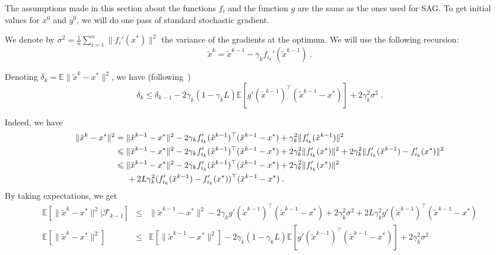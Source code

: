 \documentclass{article}
\newcommand{\BEAS}{\begin{eqnarray*}}
\newcommand{\EEAS}{\end{eqnarray*}}
\def\E{_{\scriptscriptstyle E}}
\def \E{{\mathbb E}}
\def \E{{\mathbb E}}
\begin{document}
The assumptions made in this section about the functions $f_i$ and the function $g$ are the same as the ones used for SAG. To get initial values for $x^0$ and $y^0$, we will do one pass of standard stochastic gradient.

We denote by $\sigma^2 = \frac{1}{n}\sum_{i=1}^n\|f_i'(x^\ast)\|^2$ the variance of the gradients at the optimum. We will use the following recursion:
$$
\tilde{x}^k = \tilde{x}^{k-1} - \gamma_k f_{i_k}'\left(\tilde{x}^{k-1}\right) \; .
$$

Denoting $\delta_k = \E \| \tilde{x}^k - x^\ast\|^2$, we have (following~\cite{bach2011non})
$$
\delta_k \leqslant \delta_{k-1} - 2 \gamma_k ( 1- \gamma_k L ) \E \left[  g'(\tilde{x}^{k-1})^\top( \tilde{x}^{k-1} - x^\ast) \right]+ 2 \gamma_k^2 \sigma^2 \; .
$$

Indeed, we have
\begin{align*}
\| \tilde{x}^k - x^\ast \|^2
& = \| \tilde{x}^{k-1} - x^\ast \|^2 - 2\gamma_k f_{i_k}'(\tilde{x}^{k-1})^\top ( \tilde{x}^{k-1} - x^\ast) + \gamma_k^2 \| f_{i_k}'(\tilde{x}^{k-1}) \|^2
\\
& \leqslant \| \tilde{x}^{k-1} - x^\ast \|^2 - 2\gamma_k f_{i_k}'(\tilde{x}^{k-1})^\top ( \tilde{x}^{k-1} - x^\ast) + 2 \gamma_k^2 \| f_{i_k}'(x^\ast) \|^2
+ 2 \gamma_k^2 \| f_{i_k}'(\tilde{x}^{k-1}) - f_{i_k}'(x^\ast) \|^2 \\
& \leqslant \| \tilde{x}^{k-1} - x^\ast \|^2 - 2\gamma_k f_{i_k}'(\tilde{x}^{k-1})^\top ( \tilde{x}^{k-1} - x^\ast) + 2\gamma_k^2 \| f_{i_k}'(x^\ast) \|^2\\
&\hspace*{.5cm} + 2 L\gamma_k^2 ( f_{i_k}'(\tilde{x}^{k-1}) - f_{i_k}'(x^\ast) ) ^\top ( \tilde{x}^{k-1} - x^\ast) \; .
\end{align*}
By taking expectations, we get
\BEAS
\E \left[ \| \tilde{x}^k - x^\ast \|^2 | \mathcal{F}_{k-1} \right]
& \leqslant &
\| \tilde{x}^{k-1} - x^\ast \|^2 - 2\gamma_k g'(\tilde{x}^{k-1})^\top ( \tilde{x}^{k-1} - x^\ast) + 2\gamma_k^2 \sigma^2
+ 2 L\gamma_k^2 g'(\tilde{x}^{k-1})^\top ( \tilde{x}^{k-1} - x^\ast) \\
\E \left[ \| \tilde{x}^k - x^\ast \|^2 \right]
& \leqslant &
\E \left[ \| \tilde{x}^{k-1} - x^\ast \|^2 \right] - 2\gamma_k ( 1 - \gamma_k L ) \E \left[ g'(\tilde{x}^{k-1})^\top ( \tilde{x}^{k-1} - x^\ast) \right] + 2\gamma_k^2 \sigma^2
\EEAS
\end{document}
